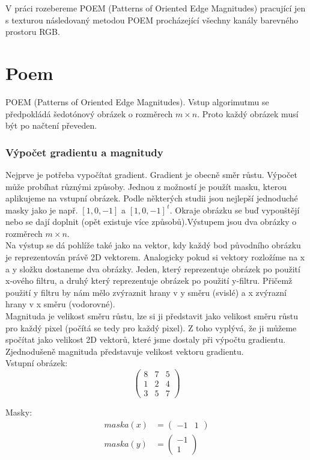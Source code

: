 \documentclass{report}
\begin{document}
V práci rozebereme POEM (Patterns of Oriented Edge Magnitudes) pracující jen s texturou následovaný metodou POEM procházející všechny kanály barevného prostoru RGB.

\chapter{Poem}
POEM (Patterns of Oriented Edge Magnitudes). Vstup algorimutmu se předpokládá šedotónový obrázek o rozměrech  $m \times n$. Proto každý obrázek musí být po načtení převeden.

\subsection{Výpočet gradientu a magnitudy}
Nejprve je potřeba vypočítat gradient. Gradient je obecně směr růstu. Výpočet může probíhat různými způsoby. Jednou z možností je použít masku, kterou aplikujeme na vstupní obrázek. Podle některých studii jsou nejlepší jednoduché masky jako je např. $[1, 0, -1]$ a $[1, 0, -1]^{\,t}$. Okraje obrázku se buď vypouštějí nebo se dají doplnit (opět existuje více způsobů).Výstupem jsou dva obrázky o rozměrech $m \times n$. \\
Na výstup se dá pohlíže také jako na vektor, kdy každý bod původního obrázku je reprezentován právě 2D vektorem. Analogicky pokud si vektory rozložíme na x a y složku dostaneme dva obrázky. Jeden, který reprezentuje obrázek po použití x-ového filtru, a druhý který reprezentuje obrázek po použití y-filtru. Přičemž použití y filtru by nám mělo zvýraznit hrany v y směru (svislé) a x zvýrazní hrany v x směru (vodorovné). \\
Magnituda je velikost směru růstu, lze si ji představit jako velikost směru růstu pro každý pixel (počítá se tedy pro každý pixel).  Z toho vyplývá, že ji můžeme spočítat jako velikost 2D vektorů, které jsme dostaly při výpočtu gradientu. Zjednodušeně magnituda představuje velikost vektoru gradientu. \\

Vstupní obrázek: 
\begin{displaymath} 
	\label{vstupni_matice} \begin{pmatrix}8 & 7 & 5 \\1 & 2 & 4 \\3 & 5 & 7 \end{pmatrix}
\end{displaymath}

Masky:
\begin{align}
	\label{masky}
		maska(x) &= \begin{pmatrix}-1 & 1 \end{pmatrix} \\
		maska(y) &= \begin{pmatrix}-1 \\ 1 \end{pmatrix}
\end{align}
\end{document}
